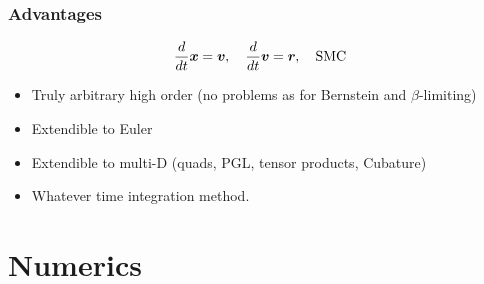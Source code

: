 \documentclass[pt12]{beamer}
\newcommand{\uvec}[2][3]{\boldsymbol{#2\mkern-#1mu}\mkern#1mu}
\begin{document}
\begin{frame}
\frametitle{Advantages}

\begin{align*}
\frac{d}{dt}\uvec{x}=\uvec{v}, \quad \frac{d}{dt}\uvec{v}=\uvec{r}, \quad \text{SMC}
\end{align*}


\begin{itemize}

\item Truly arbitrary high order (no problems as for Bernstein and $\beta$-limiting)

\item Extendible to Euler

\item Extendible to multi-D (quads, PGL, tensor products, Cubature)

\item Whatever time integration method.

\end{itemize}

\end{frame}


\section{Numerics}
\frame\sectionpage
\end{document}
